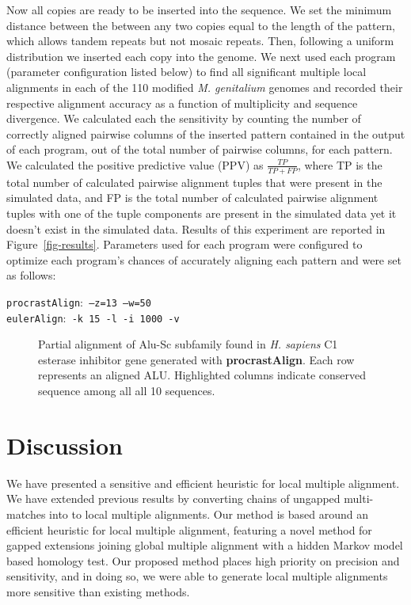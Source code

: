 \documentclass{ws-procs975x65}
\begin{document}
Now all copies are ready to be inserted into the sequence. We set the minimum distance between the between any two copies equal to the length of the pattern, which allows tandem repeats but not mosaic repeats. Then, following a uniform distribution we inserted each copy into the genome.  We next used each program (parameter configuration listed below) to find all significant multiple local alignments in each of the 110 modified \emph{M. genitalium} genomes and recorded their respective alignment accuracy as a function of multiplicity and sequence divergence. We calculated each the sensitivity by counting the number of correctly aligned pairwise columns of the inserted pattern contained in the output of each program, out of the total number of pairwise columns, for each pattern. We calculated the positive predictive value (PPV) as
$\frac{TP}{TP + FP}$, where TP is the total number of calculated pairwise alignment tuples that were present in
the simulated data, and FP is the total number of calculated pairwise alignment tuples with
one of the tuple components are present in the simulated data yet it doesn't exist in the simulated data.  Results of this experiment are reported in Figure~\ref{fig-results}. Parameters used for each program were configured to optimize each program's chances of accurately aligning each pattern and were set as follows:  \begin{center}\texttt{procrastAlign}:\texttt{ --z=13 --w=50 } \\ \texttt{eulerAlign}:\texttt{ -k 15 -l -i 1000 -v}\end{center}


\begin{figure}[t]
\centering {}
\caption{Partial alignment of Alu-Sc subfamily found in \emph{H. sapiens} C1 esterase inhibitor gene generated with \textbf{procrastAlign}. Each row represents an aligned ALU. Highlighted columns indicate conserved sequence among all all 10 sequences.}
\label{fig-align}
\end{figure}

\section{Discussion}

We have presented a sensitive and efficient heuristic for local multiple alignment. We have extended previous results by converting chains of ungapped multi-matches into to local multiple alignments. Our method is based around an efficient heuristic for local multiple alignment, featuring a novel method for gapped extensions joining global multiple alignment with a hidden Markov model based homology test. Our proposed method places high priority on precision and sensitivity, and in doing so, we were able to generate local multiple alignments more sensitive than existing methods.
\end{document}
